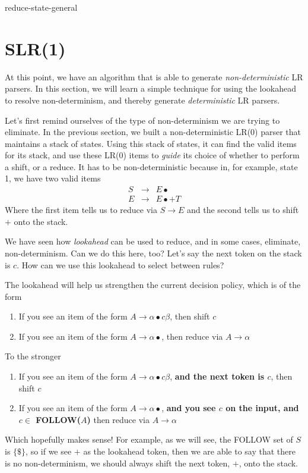 \begin{center}
    {reduce-state-general}
\end{center}




\section{SLR(1)}\label{section:slr1}
At this point, we have an algorithm that is able to generate \textit{non-deterministic} LR parsers. In this section, we will learn a simple technique for using the lookahead to resolve non-determinism, and thereby generate \textit{deterministic} LR parsers. 

Let's first remind ourselves of the type of non-determinism we are trying to eliminate. In the previous section, we built a non-deterministic LR($0$) parser that maintains a stack of states. Using this stack of states, it can find the valid items for its stack, and use these LR($0$) items to \textit{guide} its choice of whether to perform a shift, or a reduce. It has to be non-deterministic because in, for example, state 1, we have two valid items
\[
\begin{array}{rcl}
     S&\to&E\bullet  \\
     E&\to&E\bullet+T 
\end{array}
\]
Where the first item tells us to reduce via $S \to E$ and the second tells us to shift $+$ onto the stack.

We have seen how \textit{lookahead} can be used to reduce, and in some cases, eliminate, non-determinism. Can we do this here, too? Let's say the next token on the stack is $c$. How can we use this lookahead to select between rules?

The lookahead will help us strengthen the current decision policy, which is of the form
\begin{enumerate}
    \item If you see an item of the form $A \to \alpha \bullet c \beta$, then shift $c$
    \item If you see an item of the form $A \to \alpha \bullet$, then reduce via $A \to \alpha$
\end{enumerate}
To the stronger
\begin{enumerate}
    \item If you see an item of the form $A \to \alpha \bullet c \beta$, \textbf{and the next token is $c$}, then shift $c$
    \item If you see an item of the form $A \to \alpha \bullet$, \textbf{and you see $c$ on the input, and $c \in$ FOLLOW($A$)} then reduce via $A \to \alpha$
\end{enumerate}
Which hopefully makes sense! For example, as we will see, the FOLLOW set of $S$ is $\{\$\}$, so if we see $+$ as the lookahead token, then we are able to say that there is no non-determinism, we should always shift the next token, $+$, onto the stack. 

